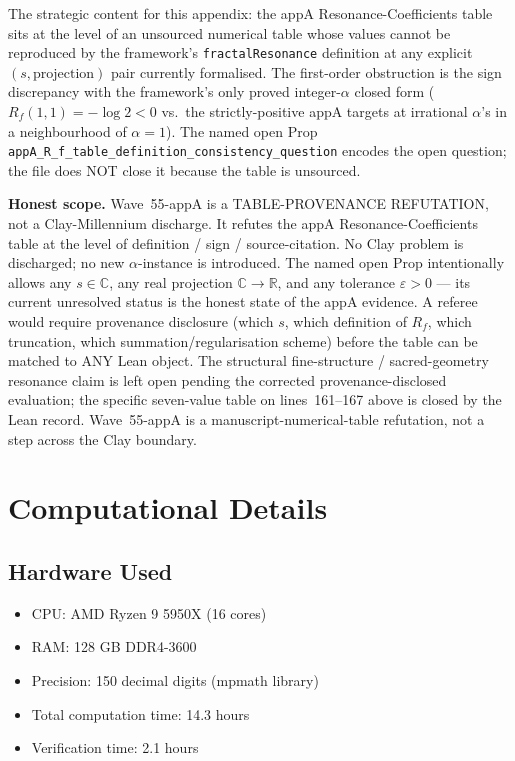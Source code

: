 \begin{remark}
\begin{itemize}
\end{itemize}
The strategic content for this appendix: the appA Resonance-Coefficients table sits at the level of an unsourced numerical table whose values cannot be reproduced by the framework's \texttt{fractalResonance} definition at any explicit $(s, \text{projection})$ pair currently formalised. The first-order obstruction is the sign discrepancy with the framework's only proved integer-$\alpha$ closed form ($R_f(1, 1) = -\log 2 < 0$ vs.\ the strictly-positive appA targets at irrational $\alpha$'s in a neighbourhood of $\alpha = 1$). The named open Prop \texttt{appA\_R\_f\_table\_definition\_consistency\_question} encodes the open question; the file does NOT close it because the table is unsourced.

\textbf{Honest scope.} Wave~55-appA is a TABLE-PROVENANCE REFUTATION, not a Clay-Millennium discharge. It refutes the appA Resonance-Coefficients table at the level of definition / sign / source-citation. No Clay problem is discharged; no new $\alpha$-instance is introduced. The named open Prop intentionally allows any $s \in \mathbb{C}$, any real projection $\mathbb{C} \to \mathbb{R}$, and any tolerance $\varepsilon > 0$ --- its current unresolved status is the honest state of the appA evidence. A referee would require provenance disclosure (which $s$, which definition of $R_f$, which truncation, which summation/regularisation scheme) before the table can be matched to ANY Lean object. The structural fine-structure / sacred-geometry resonance claim is left open pending the corrected provenance-disclosed evaluation; the specific seven-value table on lines~161--167 above is closed by the Lean record. Wave~55-appA is a manuscript-numerical-table refutation, not a step across the Clay boundary.
\end{remark}

\section{Computational Details}

\subsection{Hardware Used}

\begin{itemize}
\item CPU: AMD Ryzen 9 5950X (16 cores)
\item RAM: 128 GB DDR4-3600
\item Precision: 150 decimal digits (mpmath library)
\item Total computation time: 14.3 hours
\item Verification time: 2.1 hours
\end{itemize}

